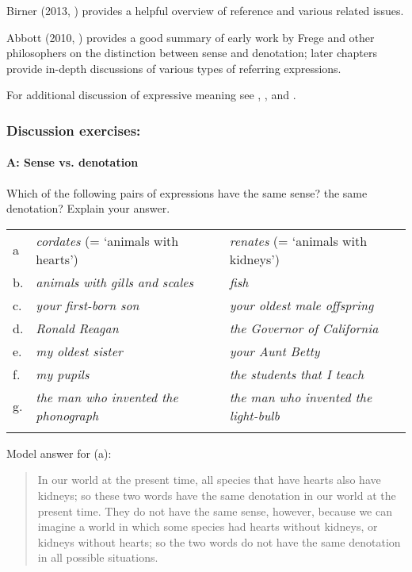 Birner (2013, ) provides a helpful overview of reference and various related issues.



Abbott (2010, ) provides a good summary of early work by Frege and other philosophers on the distinction between sense and denotation; later chapters provide in-depth discussions of various types of referring expressions. 



For additional discussion of expressive meaning see \citet{Cruse1986,Cruse2000}, \citet{Potts2007b}, and \citet{Kratzer1999}.


\subsubsection{Discussion exercises:}\label{sec:}
\paragraph{A: Sense vs. denotation}

Which of the following pairs of expressions have the same sense? the same denotation? Explain your answer.

\begin{tabularx}{\textwidth}{XXX}
\lsptoprule
a & \textit{cordates} (= ‘animals with hearts’) & \textit{renates} (= ‘animals with kidneys’)\\               
b. & \itshape animals with gills and scales & \itshape fish\\
c. & \itshape your first-born son & \itshape your oldest male offspring\\
d. & \itshape Ronald Reagan & \itshape the Governor of California\\
e. & \itshape my oldest sister & \itshape your Aunt Betty\\
f. & \itshape my pupils & \itshape the students that I teach\\
g. & \textit{the man who invented the phonograph} & \textit{the man who invented the light-bulb}\\
\lspbottomrule
\end{tabularx}

\noindent Model answer for (a):\\
\begin{quote} In our world at the present time, all species that have hearts also have kidneys; so these two words have the same denotation in our world at the present time. They do not have the same sense, however, because we can imagine a world in which some species had hearts without kidneys, or kidneys without hearts; so the two words do not have the same denotation in all possible situations. \end{quote}

